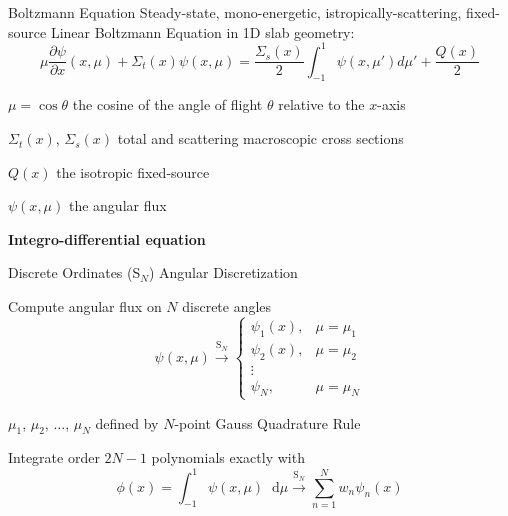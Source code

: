 \documentclass[10pt,draft]{beamer}
\newcommand{\SN}{S$_N$\xspace}
\newcommand{\ud}{\mathop{}\!\mathrm{d}} %
\newcommand{\pderiv}[2]{\frac{\partial #1}{\partial #2}}
\begin{document}
\begin{frame}{Boltzmann Equation}
	Steady-state, mono-energetic, istropically-scattering, fixed-source \alert{Linear Boltzmann Equation} in 1D slab geometry:
	\begin{equation*}
		\mu \pderiv{\psi}{x}(x, \mu) + \Sigma_t(x) \psi(x,\mu) = 
		\frac{\Sigma_s(x)}{2} \int_{-1}^{1} \psi(x, \mu') d\mu' + \frac{Q(x)}{2}
	\end{equation*}

	$\mu = \cos \theta$ the cosine of the angle of flight $\theta$ relative to the $x$-axis

	$\Sigma_t(x)$, $\Sigma_s(x)$ total and scattering macroscopic cross sections 

	$Q(x)$ the isotropic fixed-source

	$\psi(x,\mu)$ the angular flux 


	\vfill
	\centerline{\textbf{Integro-differential equation}}

\end{frame}

\begin{frame}{Discrete Ordinates (\SN) Angular Discretization}

	Compute angular flux on $N$ discrete angles
	\begin{equation*}
		\psi(x,\mu) \xrightarrow{\text{S}_N} 
		\begin{cases}
			\psi_1(x), & \mu = \mu_1 \\ 
			\psi_2(x), & \mu = \mu_2 \\ 
			\vdots \\ 
			\psi_N, & \mu = \mu_N 
		\end{cases}
	\end{equation*}

	\pause
	$\mu_1$, $\mu_2$, $\dots$, $\mu_N$ defined by $N$-point Gauss Quadrature Rule 

	\pause
	Integrate order $2N-1$ polynomials exactly with 
	\begin{equation*}
		\phi(x) = \int_{-1}^1 \psi(x, \mu) \ud\mu 
			\xrightarrow{\text{S}_N} \sum_{n=1}^N 
			w_n \psi_n(x)
	\end{equation*}

\end{frame}
\end{document}
